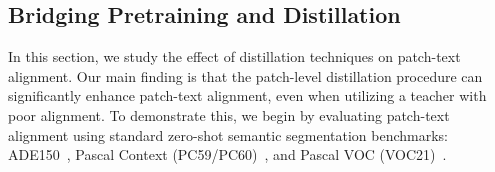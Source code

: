 \subsection{Bridging Pretraining and Distillation}
\label{bridge}



In this section, we study the effect of distillation techniques on patch-text alignment. Our main finding is that the patch-level distillation procedure can significantly enhance patch-text alignment, even when utilizing a teacher with poor alignment. To demonstrate this, we begin by evaluating patch-text alignment using standard zero-shot semantic segmentation benchmarks: ADE150~\citep{zhou2017ade20k, zhou2018semanticunderstandingscenesade20k}, Pascal Context (PC59/PC60)~\citep{Mottaghi_2014_CVPR}, and Pascal VOC (VOC21)~\citep{everingham2010pascal}.


